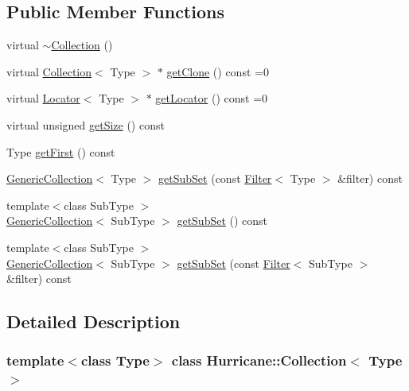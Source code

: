 \subsection*{Public Member Functions}
\begin{DoxyCompactItemize}
\item 
virtual \mbox{\hyperlink{classHurricane_1_1Collection_aafcf8e05658e245b2a762baa7a59f281}{$\sim$\+Collection}} ()
\item 
virtual \mbox{\hyperlink{classHurricane_1_1Collection}{Collection}}$<$ Type $>$ $\ast$ \mbox{\hyperlink{classHurricane_1_1Collection_ac75b91d3952b36e14f21174958523924}{get\+Clone}} () const =0
\item 
virtual \mbox{\hyperlink{classHurricane_1_1Locator}{Locator}}$<$ Type $>$ $\ast$ \mbox{\hyperlink{classHurricane_1_1Collection_a48fd1a0a2b6d2530a87e22ba65aa3152}{get\+Locator}} () const =0
\item 
virtual unsigned \mbox{\hyperlink{classHurricane_1_1Collection_a1292aabe88c9aadfdfe21dabddb62c19}{get\+Size}} () const
\item 
Type \mbox{\hyperlink{classHurricane_1_1Collection_a846a042646e02a0f77d2ce0f6190288a}{get\+First}} () const
\item 
\mbox{\hyperlink{classHurricane_1_1GenericCollection}{Generic\+Collection}}$<$ Type $>$ \mbox{\hyperlink{classHurricane_1_1Collection_aa32ea7249d57ee05e3c71dcde8106832}{get\+Sub\+Set}} (const \mbox{\hyperlink{classHurricane_1_1Filter}{Filter}}$<$ Type $>$ \&filter) const
\item 
{\footnotesize template$<$class Sub\+Type $>$ }\\\mbox{\hyperlink{classHurricane_1_1GenericCollection}{Generic\+Collection}}$<$ Sub\+Type $>$ \mbox{\hyperlink{classHurricane_1_1Collection_a91d986e21395d4021d927e06f204ab6c}{get\+Sub\+Set}} () const
\item 
{\footnotesize template$<$class Sub\+Type $>$ }\\\mbox{\hyperlink{classHurricane_1_1GenericCollection}{Generic\+Collection}}$<$ Sub\+Type $>$ \mbox{\hyperlink{classHurricane_1_1Collection_a673afd14782da82ad03a68366ae1f09b}{get\+Sub\+Set}} (const \mbox{\hyperlink{classHurricane_1_1Filter}{Filter}}$<$ Sub\+Type $>$ \&filter) const
\end{DoxyCompactItemize}


\subsection{Detailed Description}
\subsubsection*{template$<$class Type$>$\newline
class Hurricane\+::\+Collection$<$ Type $>$}

